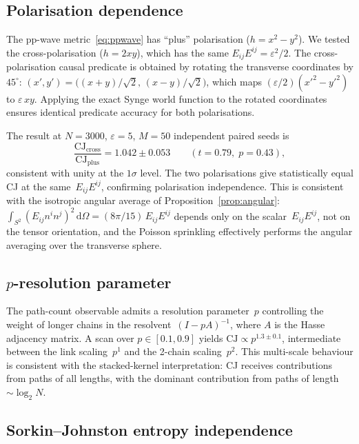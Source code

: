 \documentclass[12pt,a4paper]{article}
\theoremstyle{plain}
\theoremstyle{definition}
\theoremstyle{remark}
\newcommand{\dd}{\mathrm{d}}
\newcommand{\Esq}{E_{ij}E^{ij}}
\newcommand{\CJ}{\mathrm{CJ}}
\begin{document}
\subsection{Polarisation dependence}
\label{sec:polarisation}

The pp-wave metric~\eqref{eq:ppwave} has ``plus'' polarisation
($h = x^2 - y^2$).  We tested the cross-polarisation
($h = 2xy$), which has the same $\Esq = \varepsilon^2/2$.
The cross-polarisation causal predicate is obtained by rotating
the transverse coordinates by $45^\circ$:
$(x', y') = \bigl((x+y)/\sqrt{2},\, (x-y)/\sqrt{2}\bigr)$,
which maps $(\varepsilon/2)(x'^2 - y'^2)$ to $\varepsilon\, xy$.
Applying the exact Synge world function to the rotated coordinates
ensures identical predicate accuracy for both polarisations.

The result at $N = 3000$, $\varepsilon = 5$, $M = 50$
independent paired seeds is
\begin{equation}
  \frac{\CJ_{\mathrm{cross}}}{\CJ_{\mathrm{plus}}}
  = 1.042 \pm 0.053
  \qquad (t = 0.79,\; p = 0.43),
\end{equation}
consistent with unity at the $1\sigma$ level.  The two
polarisations give statistically equal CJ at the same~$\Esq$,
confirming polarisation independence.  This is consistent with
the isotropic angular average of
Proposition~\ref{prop:angular}:
$\int_{S^2}(E_{ij}n^in^j)^2\,\dd\Omega = (8\pi/15)\,\Esq$
depends only on the scalar~$\Esq$, not on the tensor orientation,
and the Poisson sprinkling effectively performs the angular
averaging over the transverse sphere.

\subsection{$p$-resolution parameter}
\label{sec:pdep}

The path-count observable admits a resolution parameter~$p$
controlling the weight of longer chains in the
resolvent~$(I - pA)^{-1}$, where $A$ is the Hasse adjacency matrix.
A scan over $p \in [0.1, 0.9]$ yields
$\CJ \propto p^{1.3 \pm 0.1}$, intermediate between the link
scaling~$p^1$ and the 2-chain scaling~$p^2$.  This multi-scale
behaviour is consistent with the stacked-kernel interpretation:
CJ receives contributions from paths of all lengths, with the
dominant contribution from paths of length $\sim \log_2 N$.

\subsection{Sorkin--Johnston entropy independence}
\label{sec:sjentropy}
\end{document}
